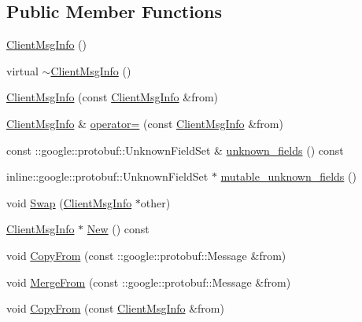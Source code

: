 \subsection*{Public Member Functions}
\begin{DoxyCompactItemize}
\item 
\hyperlink{class_i_m_1_1_base_define_1_1_client_msg_info_a46b71560b32d1256c4e5e995a4ebf89d}{Client\+Msg\+Info} ()
\item 
virtual \hyperlink{class_i_m_1_1_base_define_1_1_client_msg_info_a84c9852d98066c27f6e3f0fe978c37a5}{$\sim$\+Client\+Msg\+Info} ()
\item 
\hyperlink{class_i_m_1_1_base_define_1_1_client_msg_info_af69eaa6b1ebf49ef42c14cbd45d35212}{Client\+Msg\+Info} (const \hyperlink{class_i_m_1_1_base_define_1_1_client_msg_info}{Client\+Msg\+Info} \&from)
\item 
\hyperlink{class_i_m_1_1_base_define_1_1_client_msg_info}{Client\+Msg\+Info} \& \hyperlink{class_i_m_1_1_base_define_1_1_client_msg_info_a8274ee9eca513873f93e2cd5f9bc73c6}{operator=} (const \hyperlink{class_i_m_1_1_base_define_1_1_client_msg_info}{Client\+Msg\+Info} \&from)
\item 
const \+::google\+::protobuf\+::\+Unknown\+Field\+Set \& \hyperlink{class_i_m_1_1_base_define_1_1_client_msg_info_a33a7184ecb0faaec7d8a08949926a194}{unknown\+\_\+fields} () const 
\item 
inline\+::google\+::protobuf\+::\+Unknown\+Field\+Set $\ast$ \hyperlink{class_i_m_1_1_base_define_1_1_client_msg_info_afa038a18c972da8ac2b5670f4aa9d5ed}{mutable\+\_\+unknown\+\_\+fields} ()
\item 
void \hyperlink{class_i_m_1_1_base_define_1_1_client_msg_info_a5be075d895b6540c6b5e385f2c1d4026}{Swap} (\hyperlink{class_i_m_1_1_base_define_1_1_client_msg_info}{Client\+Msg\+Info} $\ast$other)
\item 
\hyperlink{class_i_m_1_1_base_define_1_1_client_msg_info}{Client\+Msg\+Info} $\ast$ \hyperlink{class_i_m_1_1_base_define_1_1_client_msg_info_a6aa8290c23fcfefbd4a8c7d369f9830f}{New} () const 
\item 
void \hyperlink{class_i_m_1_1_base_define_1_1_client_msg_info_a10a3064169c5b3935fb0968587666d0b}{Copy\+From} (const \+::google\+::protobuf\+::\+Message \&from)
\item 
void \hyperlink{class_i_m_1_1_base_define_1_1_client_msg_info_a706fb049b951d63fab1b5a57d07fa822}{Merge\+From} (const \+::google\+::protobuf\+::\+Message \&from)
\item 
void \hyperlink{class_i_m_1_1_base_define_1_1_client_msg_info_ace491d72f9c6d07539c2934ec5c044bd}{Copy\+From} (const \hyperlink{class_i_m_1_1_base_define_1_1_client_msg_info}{Client\+Msg\+Info} \&from)

\end{DoxyCompactItemize}
